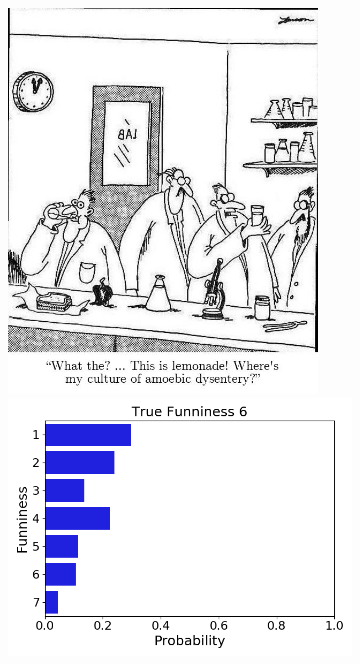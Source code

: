 \documentclass[draft,final,oneside]{vutinfth} %
\begin{document}
\begin{figure}
\begin{subfigure}[b]{0.45\textwidth}
\includegraphics[width=0.9\textwidth,height=0.3\textheight,keepaspectratio]{graphics/detail/Test_for_Image_6_cartoon} \\
\includegraphics[width=1.0\textwidth]{graphics/detail/Test_for_Image_6}
\end{subfigure}


\end{figure}
\end{document}
